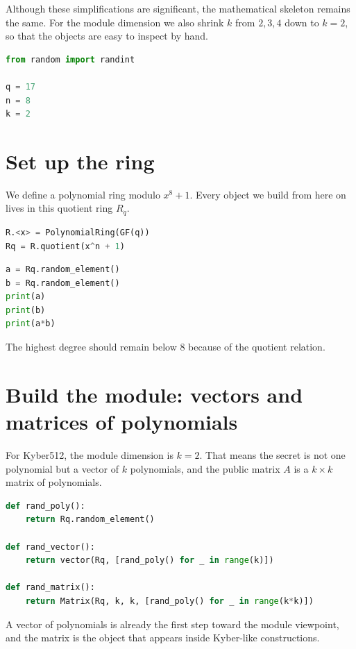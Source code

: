 Although these simplifications are significant, the mathematical skeleton remains the same. For the module dimension we also shrink $k$ from $2,3,4$ down to $k=2$, so that the objects are easy to inspect by hand.

\begin{lstlisting}[language=Python]
from random import randint

q = 17
n = 8
k = 2
\end{lstlisting}

\section{Set up the ring}

We define a polynomial ring modulo $x^8+1$. Every object we build from here on lives in this quotient ring $R_q$.

\begin{lstlisting}[language=Python]
R.<x> = PolynomialRing(GF(q))
Rq = R.quotient(x^n + 1)
\end{lstlisting}

\begin{lstlisting}[language=Python]
a = Rq.random_element()
b = Rq.random_element()
print(a)
print(b)
print(a*b)
\end{lstlisting}

The highest degree should remain below $8$ because of the quotient relation.

\section{Build the module: vectors and matrices of polynomials}

For Kyber512, the module dimension is $k=2$. That means the secret is not one polynomial but a vector of $k$ polynomials, and the public matrix $A$ is a $k \times k$ matrix of polynomials.

\begin{lstlisting}[language=Python]
def rand_poly():
    return Rq.random_element()

def rand_vector():
    return vector(Rq, [rand_poly() for _ in range(k)])

def rand_matrix():
    return Matrix(Rq, k, k, [rand_poly() for _ in range(k*k)])
\end{lstlisting}

A vector of polynomials is already the first step toward the module viewpoint, and the matrix is the object that appears inside Kyber-like constructions.

